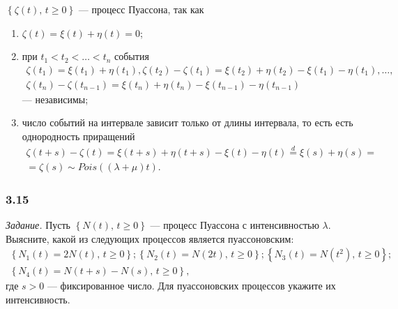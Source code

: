 $ \left\{ \zeta \left( t \right), \, t \geq 0 \right\} $ --- процесс Пуассона, так как
\begin{enumerate}
  \item $ \zeta \left( t \right) = \xi \left( t \right) + \eta \left( t \right) = 0$;
  \item при $t_1 < t_2 < \dotsc < t_n$ события
  \begin{gather*}
    \zeta \left( t_1 \right) = \xi \left( t_1 \right) + \eta \left( t_1 \right),
    \zeta \left( t_2 \right) - \zeta \left( t_1 \right) =
    \xi \left( t_2 \right) + \eta \left( t_2 \right) -
    \xi \left( t_1 \right) - \eta \left( t_1 \right),
    \dotsc, \\
    \zeta \left( t_n \right) - \zeta \left( t_{n - 1} \right) =
    \xi \left( t_n \right) + \eta \left( t_n \right) -
    \xi \left( t_{n - 1} \right) - \eta \left( t_{n - 1} \right)
  \end{gather*}
  --- независимы;
  \item число событий на интервале зависит только от длины интервала,
  то есть есть однородность приращений
  \begin{gather*}
    \zeta \left( t + s \right) - \zeta \left( t \right) =
    \xi \left( t + s \right) + \eta \left( t + s \right) -
    \xi \left( t \right) - \eta \left( t \right) \overset{d}{=}
    \xi \left( s \right) + \eta \left( s \right) = \\
    = \zeta \left( s \right) \sim
    Pois \left( \left( \lambda + \mu \right) t \right).
  \end{gather*}
\end{enumerate}

\subsubsection*{3.15}

\textit{Задание.}
Пусть $ \left\{ N \left( t \right), \, t \geq 0 \right\} $ ---
процесс Пуассона с интенсивностью $ \lambda $.
Выясните, какой из следующих процессов является пуассоновским:
\begin{gather*}
  \left\{ N_1 \left( t \right) = 2N \left( t \right), \, t \geq 0 \right\};
  \left\{ N_2 \left( t \right) = N \left( 2t \right), \, t \geq 0 \right\};
  \left\{ N_3 \left( t \right) = N \left( t^2 \right), \, t \geq 0 \right\}; \\
  \left\{ N_4 \left( t \right) = N \left( t + s \right) - N \left( s \right), \, t \geq 0 \right\},
\end{gather*}
где $s > 0$ --- фиксированное число.
Для пуассоновских процессов укажите их интенсивность.

